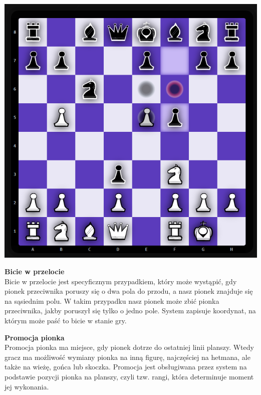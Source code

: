 \documentclass[12pt,a4paper]{article}
\begin{document}
\begin{minipage}[t]{0.3\textwidth} 
    \vspace{0pt} 
    \centering 
    \includegraphics[width=\linewidth]{images/imp_front_enpassant.png} 
\end{minipage} 
\hfill 
\begin{minipage}[t]{0.6\textwidth} 
    \vspace{0pt} 
    \raggedright 
    \textbf{Bicie w przelocie}\\
    Bicie w przelocie jest specyficznym przypadkiem, który może wystąpić, gdy pionek przeciwnika poruszy się o dwa pola do przodu, a nasz pionek znajduje się na sąsiednim polu. W takim przypadku nasz pionek może zbić pionka przeciwnika, jakby poruszył się tylko o jedno pole. System zapisuje koordynat, na którym może paść to bicie w stanie gry.
\end{minipage}
\vspace{1cm}
\begin{minipage}[t]{0.6\textwidth} 
    \vspace{0pt} 
    \raggedright 
    \textbf{Promocja pionka}\\
    Promocja pionka ma miejsce, gdy pionek dotrze do ostatniej linii planszy. Wtedy gracz ma możliwość wymiany pionka na inną figurę, najczęściej na hetmana, ale także na wieżę, gońca lub skoczka. Promocja jest obsługiwana przez system na podstawie pozycji pionka na planszy, czyli tzw. rangi, która determinuje moment jej wykonania.
\end{minipage} 
\end{document}
